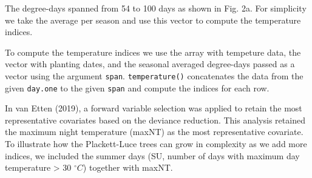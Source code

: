 \documentclass[
]{article}
\newenvironment{Shaded}{\begin{snugshade}}{\end{snugshade}}
\newcommand{\CommentTok}[1]{\textcolor[rgb]{0.56,0.35,0.01}{\textit{#1}}}
\newcommand{\DataTypeTok}[1]{\textcolor[rgb]{0.13,0.29,0.53}{#1}}
\newcommand{\DecValTok}[1]{\textcolor[rgb]{0.00,0.00,0.81}{#1}}
\newcommand{\KeywordTok}[1]{\textcolor[rgb]{0.13,0.29,0.53}{\textbf{#1}}}
\newcommand{\NormalTok}[1]{#1}
\newcommand{\OperatorTok}[1]{\textcolor[rgb]{0.81,0.36,0.00}{\textbf{#1}}}
\newcommand{\StringTok}[1]{\textcolor[rgb]{0.31,0.60,0.02}{#1}}
\begin{document}
The degree-days spanned from 54 to 100 days as shown in Fig. 2a. For
simplicity we take the average per season and use this vector to compute
the temperature indices.

\begin{Shaded}
\end{Shaded}

To compute the temperature indices we use the array with tempeture data,
the vector with planting dates, and the seasonal averaged degree-days
passed as a vector using the argument \texttt{span}.
\texttt{temperature()} concatenates the data from the given
\texttt{day.one} to the given \texttt{span} and compute the indices for
each row.

In van Etten (2019), a forward variable selection was applied to retain
the most representative covariates based on the deviance reduction. This
analysis retained the maximum night temperature (maxNT) as the most
representative covariate. To illustrate how the Plackett-Luce trees can
grow in complexity as we add more indices, we included the summer days
(SU, number of days with maximum day temperature \textgreater{} 30
\(^\circ C\)) together with maxNT.
\end{document}
